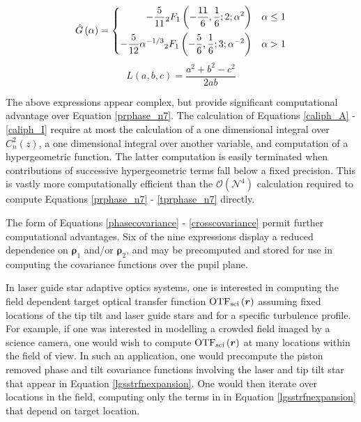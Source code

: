 \begin{equation}\label{G_hat_eqn}
\hat{G}\left(\alpha\right) = 
\left\{
\begin{aligned}
-\frac{5}{11} \vphantom{F}_{2}F_{1}\left(-\frac{11}{6}, \frac{1}{6};2; \alpha^{2}\right)              & \quad \alpha\le 1 \\
-\frac{5}{12} \alpha^{-1/3} \vphantom{F}_{2}F_{1}\left(-\frac{5}{6}, \frac{1}{6};3; \alpha^{-2}\right)  & \quad \alpha > 1
\end{aligned}
\right.
\end{equation}
\begin{equation}
L\left(a, b, c\right) = \frac{a^{2} + b^{2} - c^{2}}{2 a b}
\end{equation}

The above expressions appear complex, but provide significant
computational advantage over Equation \ref{prphase_n7}.  The
calculation of Equations \ref{caliph_A} - \ref{caliph_I} require at
most the calculation of a one dimensional integral over
$C_{n}^{2}(z)$, a one dimensional integral over another variable, and
computation of a hypergeometric function.  The latter computation is
easily terminated when contributions of successive hypergeometric
terms fall below a fixed precision.  This is vastly more
computationally efficient than the $\mathcal{O}(\mathcal{N}^{4})$
calculation required to compute Equations \ref{prphase_n7} -
\ref{tprphase_n7} directly.

The form of Equations \ref{phasecovariance} - \ref{crosscovariance}
permit further computational advantages.  Six of the nine expressions
display a reduced dependence on $\boldsymbol{\rho}_{1}$ and/or
$\boldsymbol{\rho}_{2}$, and may be precomputed and stored for use in
computing the covariance functions over the pupil plane.

In laser guide star adaptive optics systems, one is interested in
computing the field dependent target optical transfer function
${\rm OTF}_{\rm sci}\left(\boldsymbol{r}\right)$ assuming fixed locations of
the tip tilt and laser guide stars and for a specific turbulence
profile.  For example, if one was interested in modelling a crowded
field imaged by a science camera, one would wish to compute ${\rm OTF}_{\rm
  sci}\left(\boldsymbol{r}\right)$ at many locations within the field
of view.  In such an application, one would precompute the piston
removed phase and tilt covariance functions involving the laser and
tip tilt star that appear in Equation \ref{lgsstrfnexpansion}.  One
would then iterate over locations in the field, computing only the
terms in in Equation \ref{lgsstrfnexpansion} that depend on target
location.


